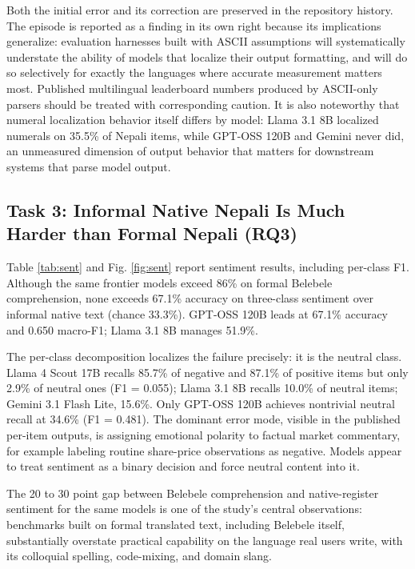 \documentclass[conference]{IEEEtran}
\begin{document}
Both the initial error and its correction are preserved in the repository history. The episode is reported as a finding in its own right because its implications generalize: evaluation harnesses built with ASCII assumptions will systematically understate the ability of models that localize their output formatting, and will do so selectively for exactly the languages where accurate measurement matters most. Published multilingual leaderboard numbers produced by ASCII-only parsers should be treated with corresponding caution. It is also noteworthy that numeral localization behavior itself differs by model: Llama 3.1 8B localized numerals on 35.5\% of Nepali items, while GPT-OSS 120B and Gemini never did, an unmeasured dimension of output behavior that matters for downstream systems that parse model output.

\subsection{Task 3: Informal Native Nepali Is Much Harder than Formal Nepali (RQ3)}
Table \ref{tab:sent} and Fig. \ref{fig:sent} report sentiment results, including per-class F1. Although the same frontier models exceed 86\% on formal Belebele comprehension, none exceeds 67.1\% accuracy on three-class sentiment over informal native text (chance 33.3\%). GPT-OSS 120B leads at 67.1\% accuracy and 0.650 macro-F1; Llama 3.1 8B manages 51.9\%.

The per-class decomposition localizes the failure precisely: it is the neutral class. Llama 4 Scout 17B recalls 85.7\% of negative and 87.1\% of positive items but only 2.9\% of neutral ones (F1 = 0.055); Llama 3.1 8B recalls 10.0\% of neutral items; Gemini 3.1 Flash Lite, 15.6\%. Only GPT-OSS 120B achieves nontrivial neutral recall at 34.6\% (F1 = 0.481). The dominant error mode, visible in the published per-item outputs, is assigning emotional polarity to factual market commentary, for example labeling routine share-price observations as negative. Models appear to treat sentiment as a binary decision and force neutral content into it.

The 20 to 30 point gap between Belebele comprehension and native-register sentiment for the same models is one of the study's central observations: benchmarks built on formal translated text, including Belebele itself, substantially overstate practical capability on the language real users write, with its colloquial spelling, code-mixing, and domain slang.
\end{document}
